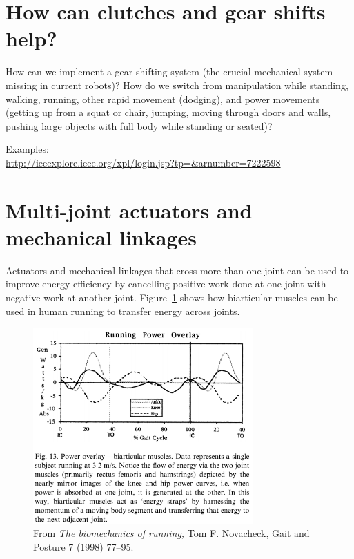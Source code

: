 \documentclass[letterpaper,12pt,fullpage]{article}
\begin{document}
\section{How can clutches and gear shifts help?}

How can we implement a gear shifting system (the crucial mechanical
system missing in current robots)? How do we switch from manipulation
while standing, walking, running, other rapid movement (dodging), and
power movements (getting up from a squat or chair,
jumping, moving through doors and walls, pushing large objects
with full body while standing or seated)?

Examples:\\
\url{http://ieeexplore.ieee.org/xpl/login.jsp?tp=&arnumber=7222598}\\

\section{Multi-joint actuators and mechanical linkages}

Actuators and mechanical linkages that cross more than one joint
can be used to improve energy efficiency by cancelling positive
work done at one joint with negative work at another joint.
Figure~\ref{f:hip-knee} shows how biarticular muscles can be used
in human running to transfer energy across joints.

\begin{figure}[t]
\centering
\includegraphics[width=0.75\textwidth]{figs/shc1}
\caption{From {\it The biomechanics of running,}
Tom F. Novacheck,
Gait and Posture 7 (1998) 77–95.}
\label{f:hip-knee}
\end{figure}
\end{document}
